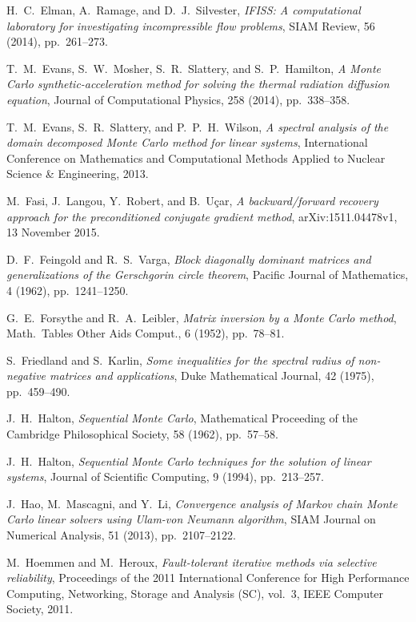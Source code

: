 \documentclass[final,leqno,onefignum,onetabnum]{siamltex1213}
\begin{document}
\begin{thebibliography}{9}
{\sc H.~C.~Elman, A.~Ramage, and D.~J.~Silvester},
{\em IFISS: A computational laboratory for investigating incompressible flow problems},
 SIAM Review, 56 (2014), pp.~261--273.

 {\sc T.~M.~Evans, S.~W.~Mosher, S.~R.~Slattery, and S.~P.~Hamilton},
 {\em A Monte Carlo synthetic-acceleration method for solving the thermal
 radiation diffusion equation},
 Journal of Computational Physics,
 258 (2014), pp.~338--358.

 {\sc T.~M.~Evans, S.~R.~Slattery, and P.~P.~H.~Wilson},
 {\em A spectral analysis of the domain decomposed Monte Carlo method for
linear systems},
 International Conference on Mathematics and Computational Methods
Applied to Nuclear Science \& Engineering, 2013.

 {\sc M.~Fasi, J.~Langou, Y.~Robert, and B.~U\c car},
 {\em A backward/forward recovery approach for the preconditioned
  conjugate gradient method}, arXiv:1511.04478v1, 13 November 2015.

{\sc D.~F.~Feingold and R.~S.~Varga},
  {\em Block diagonally dominant matrices and generalizations
   of the Gerschgorin circle theorem},
Pacific Journal of Mathematics, 4 (1962), pp.~1241--1250.

{\sc G.~E.~Forsythe and R.~A.~Leibler},
{\em Matrix inversion by a Monte Carlo method},
Math.~Tables Other Aids Comput., 6 (1952), pp.~78--81.

  {\sc S.~Friedland and S.~Karlin},
  {\em Some inequalities for the spectral radius of non-negative matrices
  and applications},
  Duke Mathematical Journal,
  42 (1975), pp.~459--490.

 {\sc J.~H.~Halton},
 {\em Sequential Monte Carlo},
 Mathematical Proceeding of the Cambridge Philosophical Society,
 58 (1962), pp.~57--58.

 {\sc J.~H.~Halton},
 {\em Sequential Monte Carlo techniques for the solution of linear
systems},
 Journal of Scientific Computing,
 9 (1994), pp.~213--257.

 {\sc J.~Hao, M.~Mascagni, and Y.~Li},
 {\em Convergence analysis of Markov chain Monte Carlo linear solvers using
Ulam-von Neumann algorithm},
 SIAM Journal on Numerical Analysis,
 51 (2013), pp.~2107--2122.

  {\sc M.~Hoemmen and M.~Heroux},
  {\em Fault-tolerant iterative methods via selective reliability},
  Proceedings of the 2011 International Conference for High Performance
Computing, Networking, Storage and Analysis (SC), vol.~3, IEEE Computer Society,
2011.


\end{thebibliography}
\end{document}
